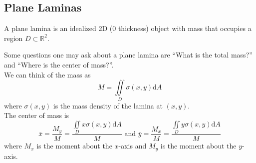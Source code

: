 \subsection{Plane Laminas}
\begin{definition}
	A plane lamina is an idealized 2D (0 thickness) object with mass that occupies a region $D \subset \mathbb{R}^2$.
\end{definition}

\noindent
Some questions one may ask about a plane lamina are ``What is the total mass?'' and ``Where is the center of mass?''.\\
We can think of the mass as 
\begin{equation*}
	M = \iint\limits_{D}{\sigma(x,y)\mathrm{d}A}
\end{equation*}
where $\sigma(x,y)$ is the mass density of the lamina at $(x,y)$.\\
The center of mass is
\begin{equation*}
	\bar{x} = \frac{M_y}{M} = \frac{\iint\limits_{D}{x\sigma(x,y)\mathrm{d}A}}{M} \text{ and } \bar{y} = \frac{M_x}{M} = \frac{\iint\limits_{D}{y\sigma(x,y)\mathrm{d}A}}{M}
\end{equation*}
where $M_x$ is the moment about the $x$-axis and $M_y$ is the moment about the $y$-axis.